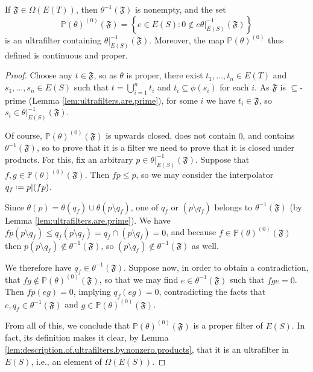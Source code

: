 \begin{lemma}\label{lem:maponspectra}
    If $\mathfrak{F}\in\Omega(E(T))$, then $\theta^{-1}(\mathfrak{F})$ is nonempty, and the set \[\mathbb{P}(\theta)^{(0)}(\mathfrak{F})=\left\{e\in E(S):0\not\in e\theta|_{E(S)}^{-1}(\mathfrak{F})\right\}\]
    is an ultrafilter containing $\theta|_{E(S)}^{-1}(\mathfrak{F})$. Moreover, the map $\mathbb{P}(\theta)^{(0)}$ thus defined is continuous and proper.
\end{lemma}
\begin{proof}
    Choose any $t\in\mathfrak{F}$, so as $\theta$ is proper, there exist $t_1,\ldots,t_n\in E(T)$ and $s_1,\ldots,s_n\in E(S)$ such that $t=\bigcup_{i=1}^n t_i$ and $t_i\subseteq\phi(s_i)$ for each $i$. As $\mathfrak{F}$ is $\subseteq$-prime (Lemma \ref{lem:ultrafilters.are.prime}), for some $i$ we have $t_i\in\mathfrak{F}$, so $s_i\in\theta|_{E(S)}^{-1}(\mathfrak{F})$.
    
    Of course, $\mathbb{P}(\theta)^{(0)}(\mathfrak{F})$ is upwards closed, does not contain $0$, and contains $\theta^{-1}(\mathfrak{F})$, so to prove that it is a filter we need to prove that it is closed under products. For this, fix an arbitrary $p\in\theta|_{E(S)}^{-1}(\mathfrak{F})$. Suppose that $f,g\in\mathbb{P}(\theta)^{(0)}(\mathfrak{F})$. Then $fp\leq p$, so we may consider the interpolator $q_f\defeq p|(fp)$.
    
    Since $\theta(p)=\theta(q_f)\cup\theta(p\setminus q_f)$, one of $q_f$ or $(p\setminus q_f)$ belongs to $\theta^{-1}(\mathfrak{F})$ (by Lemma \ref{lem:ultrafilters.are.prime}). We have $fp(p\setminus q_f)\leq q_f(p\setminus q_f)=q_f\cap(p\setminus q_f)=0$, and because $f\in\mathbb{P}(\theta)^{(0)}(\mathfrak{F})$ then $p(p\setminus q_f)\not\in\theta^{-1}(\mathfrak{F})$, so $(p\setminus q_f)\not\in\theta^{-1}(\mathfrak{F})$ as well.
    
    We therefore have $q_f\in\theta^{-1}(\mathfrak{F})$. Suppose now, in order to obtain a contradiction, that $fg\not\in\mathbb{P}(\theta)^{(0)}(\mathfrak{F})$, so that we may find $e\in\theta^{-1}(\mathfrak{F})$ such that $fge=0$. Then $fp(eg)=0$, implying $q_f(eg)=0$, contradicting the facts that $e,q_f\in\theta^{-1}(\mathfrak{F})$ and $g\in\mathbb{P}(\theta)^{(0)}(\mathfrak{F})$.
    
    From all of this, we conclude that $\mathbb{P}(\theta)^{(0)}(\mathfrak{F})$ is a proper filter of $E(S)$. In fact, its definition makes it clear, by Lemma \ref{lem:description.of.ultrafilters.by.nonzero.products}, that it is an ultrafilter in $E(S)$, i.e., an element of $\Omega(E(S))$.
    

\end{proof}

